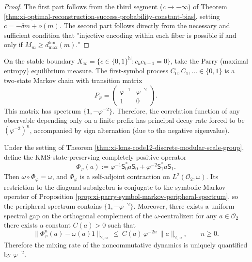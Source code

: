 \begin{proof}
The first part follows from the third segment (\(c\to-\infty\)) of Theorem \ref{thm:xi-optimal-reconstruction-success-probability-constant-bias}, setting \(c=-\delta m+o(m)\).
The second part follows directly from the necessary and sufficient condition that "injective encoding within each fiber is possible if and only if \(M_m\ge d^{\mathrm{bin}}_{\max}(m)\)."
\end{proof}

\begin{proposition}\label{prop:xi-parry-symbol-markov-peripheral-spectrum}
On the stable boundary \(X_\infty=\{c\in\{0,1\}^{\mathbb N}:c_kc_{k+1}=0\}\), take the Parry (maximal entropy) equilibrium measure.
The first-symbol process \(C_0,C_1,\dots\in\{0,1\}\) is a two-state Markov chain with transition matrix
\[
P_\varphi=
\begin{pmatrix}
\varphi^{-1} & \varphi^{-2}\\[2pt]
1 & 0
\end{pmatrix}.
\]
This matrix has spectrum \(\{1,-\varphi^{-2}\}\).
Therefore, the correlation function of any observable depending only on a finite prefix has principal decay rate forced to be \((\varphi^{-2})^{n}\), accompanied by sign alternation (due to the negative eigenvalue).
\end{proposition}

\begin{theorem}\label{thm:xi-kms-transfer-operator-spectral-gap-explicit}
Under the setting of Theorem \ref{thm:xi-kms-code12-discrete-modular-scale-group}, define the KMS-state-preserving completely positive operator
\[
\Phi_{\varphi}(a):=\varphi^{-1}\mathsf{S}_0^\ast a\mathsf{S}_0+\varphi^{-2}\mathsf{S}_1^\ast a\mathsf{S}_1.
\]
Then \(\omega\circ\Phi_{\varphi}=\omega\), and \(\Phi_{\varphi}\) is a self-adjoint contraction on \(L^2(\mathcal{O}_2,\omega)\).
Its restriction to the diagonal subalgebra is conjugate to the symbolic Markov operator of Proposition \ref{prop:xi-parry-symbol-markov-peripheral-spectrum}, so the peripheral spectrum contains \(\{1,-\varphi^{-2}\}\).
Moreover, there exists a uniform spectral gap on the orthogonal complement of the \(\omega\)-centralizer: for any \(a\in\mathcal{O}_2\) there exists a constant \(C(a)>0\) such that
\[
\|\Phi_{\varphi}^n(a)-\omega(a)1\|_{2,\omega}\ \le\ C(a)\,\varphi^{-2n}\,\|a\|_{2,\omega},
\qquad n\ge 0.
\]
Therefore the mixing rate of the noncommutative dynamics is uniquely quantified by \(\varphi^{-2}\).
\end{theorem}

